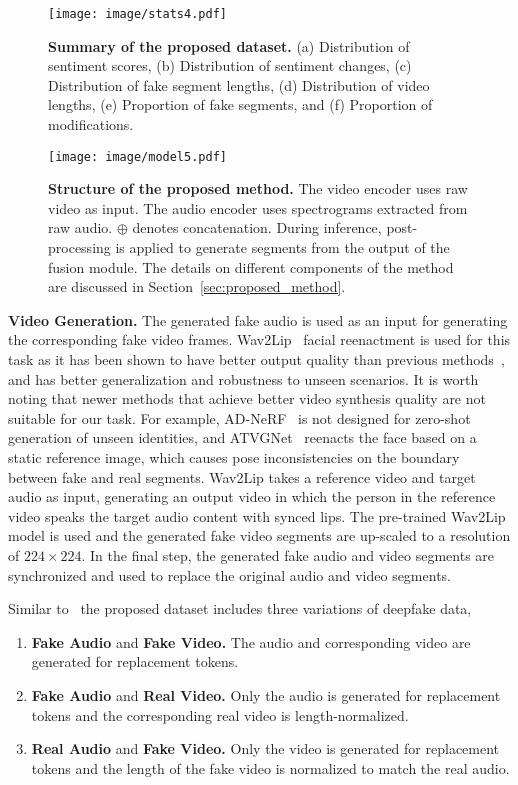 \documentclass[conference, a4paper]{IEEEtran}
\begin{document}
\begin{figure}[t]
\centering
\texttt{[image: image/stats4.pdf]}
\caption{\textbf{Summary of the proposed dataset.} (a) Distribution of sentiment scores, (b) Distribution of sentiment changes, (c) Distribution of fake segment lengths, (d) Distribution of video lengths, (e) Proportion of fake segments, and (f) Proportion of modifications.}
\label{fig:data_distribution}
\end{figure}

\begin{figure*}[t]
\centering
\texttt{[image: image/model5.pdf]}
\caption{\textbf{Structure of the proposed method.} The video encoder uses raw video as input. The audio encoder uses spectrograms extracted from raw audio. $\oplus$ denotes concatenation. During inference, post-processing is applied to generate segments from the output of the fusion module. The details on different components of the method are discussed in Section~\ref{sec:proposed_method}.}
\label{fig:model}
\end{figure*}

\noindent \textbf{Video Generation.} The generated fake audio is used as an input for generating the corresponding fake video frames. Wav2Lip~\cite{prajwal_lip_2020} facial reenactment is used for this task as it has been shown to have better output quality than previous methods~\cite{jamaludin_you_2019, k_r_towards_2019}, and has better generalization and robustness to unseen scenarios. It is worth noting that newer methods that achieve better video synthesis quality are not suitable for our task. For example, AD-NeRF~\cite{guo_ad-nerf_2021} is not designed for zero-shot generation of unseen identities, and ATVGNet~\cite{chen_hierarchical_2019} reenacts the face based on a static reference image, which causes pose inconsistencies on the boundary between fake and real segments. Wav2Lip takes a reference video and target audio as input, generating an output video in which the person in the reference video speaks the target audio content with synced lips. The pre-trained Wav2Lip model is used and the generated fake video segments are up-scaled to a resolution of $224\times 224$. In the final step, the generated fake audio and video segments are synchronized and used to replace the original audio and video segments.

Similar to~\cite{khalid_evaluation_2021} the proposed dataset includes three variations of deepfake data,

\begin{enumerate}
\item{\textbf{Fake Audio} and \textbf{Fake Video.} The audio and corresponding video are generated for replacement tokens.}
\item{\textbf{Fake Audio} and \textbf{Real Video.} Only the audio is generated for replacement tokens and the corresponding real video is length-normalized.}
\item{\textbf{Real Audio} and \textbf{Fake Video.} Only the video is generated for replacement tokens and the length of the fake video is normalized to match the real audio.}
\end{enumerate}
\end{document}
